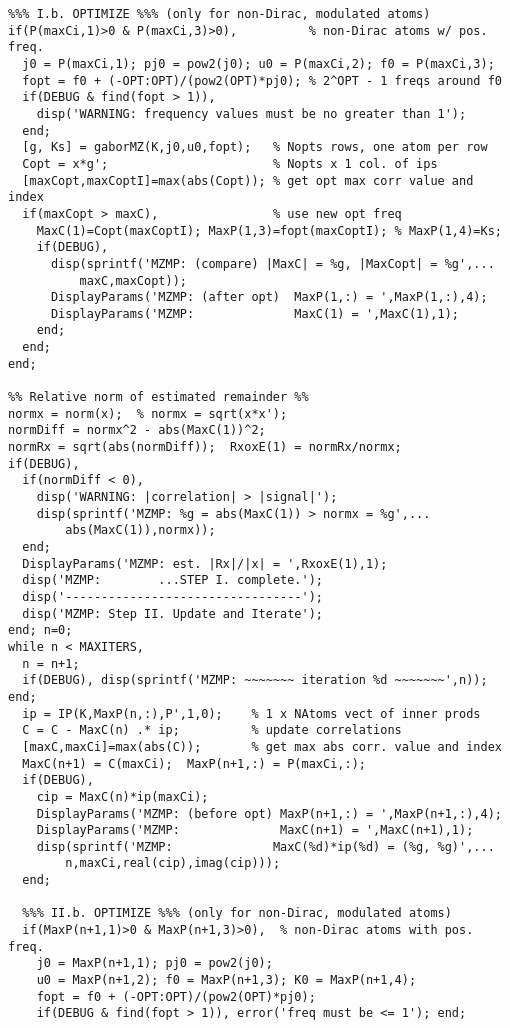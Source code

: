 \begin{small}
\begin{verbatim}
%%% I.b. OPTIMIZE %%% (only for non-Dirac, modulated atoms)
if(P(maxCi,1)>0 & P(maxCi,3)>0),          % non-Dirac atoms w/ pos. freq.
  j0 = P(maxCi,1); pj0 = pow2(j0); u0 = P(maxCi,2); f0 = P(maxCi,3);
  fopt = f0 + (-OPT:OPT)/(pow2(OPT)*pj0); % 2^OPT - 1 freqs around f0
  if(DEBUG & find(fopt > 1)),
    disp('WARNING: frequency values must be no greater than 1');
  end;
  [g, Ks] = gaborMZ(K,j0,u0,fopt);   % Nopts rows, one atom per row
  Copt = x*g';                       % Nopts x 1 col. of ips
  [maxCopt,maxCoptI]=max(abs(Copt)); % get opt max corr value and index
  if(maxCopt > maxC),                % use new opt freq 
    MaxC(1)=Copt(maxCoptI); MaxP(1,3)=fopt(maxCoptI); % MaxP(1,4)=Ks;
    if(DEBUG),
      disp(sprintf('MZMP: (compare) |MaxC| = %g, |MaxCopt| = %g',...
          maxC,maxCopt));
      DisplayParams('MZMP: (after opt)  MaxP(1,:) = ',MaxP(1,:),4);
      DisplayParams('MZMP:              MaxC(1) = ',MaxC(1),1);
    end;
  end;
end;

%% Relative norm of estimated remainder %%
normx = norm(x);  % normx = sqrt(x*x');
normDiff = normx^2 - abs(MaxC(1))^2;
normRx = sqrt(abs(normDiff));  RxoxE(1) = normRx/normx;
if(DEBUG),
  if(normDiff < 0),  
    disp('WARNING: |correlation| > |signal|');
    disp(sprintf('MZMP: %g = abs(MaxC(1)) > normx = %g',...
        abs(MaxC(1)),normx)); 
  end;
  DisplayParams('MZMP: est. |Rx|/|x| = ',RxoxE(1),1);
  disp('MZMP:        ...STEP I. complete.');
  disp('---------------------------------');
  disp('MZMP: Step II. Update and Iterate');
end; n=0; 
while n < MAXITERS,
  n = n+1;
  if(DEBUG), disp(sprintf('MZMP: ~~~~~~~ iteration %d ~~~~~~~',n)); end;
  ip = IP(K,MaxP(n,:),P',1,0);    % 1 x NAtoms vect of inner prods
  C = C - MaxC(n) .* ip;          % update correlations
  [maxC,maxCi]=max(abs(C));       % get max abs corr. value and index
  MaxC(n+1) = C(maxCi);  MaxP(n+1,:) = P(maxCi,:);
  if(DEBUG), 
    cip = MaxC(n)*ip(maxCi);
    DisplayParams('MZMP: (before opt) MaxP(n+1,:) = ',MaxP(n+1,:),4);
    DisplayParams('MZMP:              MaxC(n+1) = ',MaxC(n+1),1);
    disp(sprintf('MZMP:              MaxC(%d)*ip(%d) = (%g, %g)',...
        n,maxCi,real(cip),imag(cip)));
  end;

  %%% II.b. OPTIMIZE %%% (only for non-Dirac, modulated atoms)
  if(MaxP(n+1,1)>0 & MaxP(n+1,3)>0),  % non-Dirac atoms with pos. freq.
    j0 = MaxP(n+1,1); pj0 = pow2(j0);  
    u0 = MaxP(n+1,2); f0 = MaxP(n+1,3); K0 = MaxP(n+1,4);
    fopt = f0 + (-OPT:OPT)/(pow2(OPT)*pj0);
    if(DEBUG & find(fopt > 1)), error('freq must be <= 1'); end;


\end{verbatim}
\end{small}
